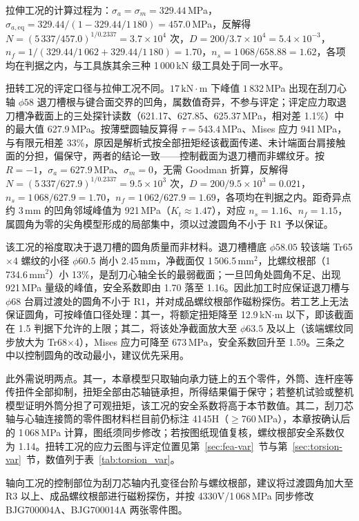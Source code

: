 拉伸工况的计算过程为：$\sigma_a=\sigma_m=329.44$\,MPa，$\sigma_{a,\mathrm{eq}}=329.44/(1-329.44/1\,180)=457.0$\,MPa，反解得 $N=(5\,337/457.0)^{1/0.2337}=3.7\times10^{4}$ 次，$D=200/3.7\times10^{4}=5.4\times10^{-3}$，$n_f=1/(329.44/1\,062+329.44/1\,180)=1.70$，$n_s=1\,068/658.88=1.62$，各项均在判据之内，与工具族其余三种 1\,000\,kN 级工具处于同一水平。

扭转工况的评定口径与拉伸工况不同。$17\,\mathrm{kN}\cdot\mathrm{m}$ 下峰值 $1\,832$\,MPa 出现在刮刀心轴 $\phi58$ 退刀槽根与键合面交界的凹角，属数值奇异，不参与评定；评定应力取退刀槽净截面上的三处探针读数（621.17、627.85、625.37\,MPa，相对差 1.1\%）中的最大值 627.9\,MPa。按薄壁圆轴反算得 $\tau=543.4$\,MPa、Mises 应力 941\,MPa，与有限元相差 33\%，原因是解析式按全部扭矩经该截面传递、未计端面台肩接触面的分担，偏保守，两者的结论一致——控制截面为退刀槽而非螺纹牙。按 $R=-1$，$\sigma_a=627.9$\,MPa、$\sigma_m=0$，无需 Goodman 折算，反解得 $N=(5\,337/627.9)^{1/0.2337}=9.5\times10^{3}$ 次，$D=200/9.5\times10^{3}=0.021$，$n_s=1\,068/627.9=1.70$，$n_f=1\,062/627.9=1.69$，各项均在判据之内。距奇异点约 3\,mm 的凹角邻域峰值为 921\,MPa（$K_t\approx1.47$），对应 $n_s=1.16$、$n_f=1.15$，属圆角为零的尖角模型形成的局部集中，须以过渡圆角不小于 R1 予以保证。

该工况的裕度取决于退刀槽的圆角质量而非材料。退刀槽槽底 $\phi58.05$ 较该端 Tr65$\times$4 螺纹的小径 $\phi60.5$ 尚小 2.45\,mm，净截面仅 1\,506.5\,mm$^2$，比螺纹根部（1\,734.6\,mm$^2$）小 13\%，是刮刀心轴全长的最弱截面；一旦凹角处圆角不足、出现 921\,MPa 量级的峰值，安全系数即由 1.70 落至 1.16。因此加工时应保证退刀槽与 $\phi68$ 台肩过渡处的圆角不小于 R1，并对成品螺纹根部作磁粉探伤。若工艺上无法保证圆角，可按峰值口径处理：其一，将额定扭矩降至 12.9\,kN$\cdot$m 以下，即该截面在 1.5 判据下允许的上限；其二，将该处净截面放大至 $\phi63.5$ 及以上（该端螺纹同步放大为 Tr68$\times$4），Mises 应力可降至 673\,MPa，安全系数回升至 1.59。三条之中以控制圆角的改动最小，建议优先采用。

此外需说明两点。其一，本章模型只取轴向承力链上的五个零件，外筒、连杆座等传扭件全部抑制，扭矩全部由芯轴链承担，所得结果偏于保守；若整机试验或整机模型证明外筒分担了可观扭矩，该工况的安全系数将高于本节数值。其二，刮刀芯轴与心轴连接筒的零件图材料栏目前仍标注 4145H（$\ge$760\,MPa），本章按确认后的 1\,068\,MPa 计算，图纸须同步修改；若按图纸现值复核，螺纹根部安全系数仅为 1.14。扭转工况的应力云图与评定位置见第~\ref{sec:fea-var}~节与第~\ref{sec:torsion-var}~节，数值列于表~\ref{tab:torsion_var}。

轴向工况的控制部位为刮刀芯轴内孔变径台阶与螺纹根部，建议将过渡圆角加大至 R3 以上、成品螺纹根部进行磁粉探伤，并按 4330V/1\,068\,MPa 同步修改 BJG700004A、BJG700014A 两张零件图。
